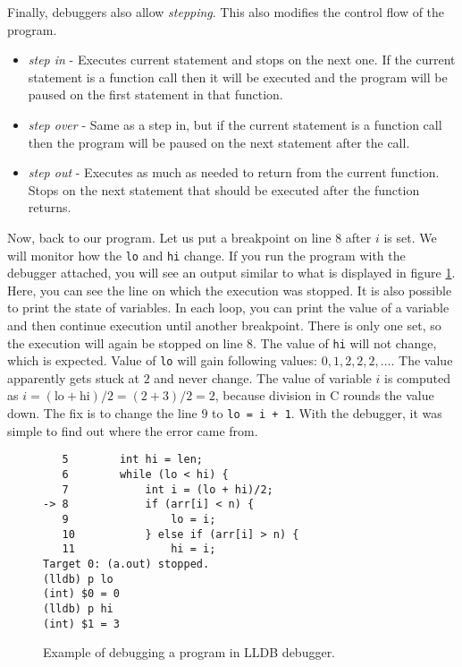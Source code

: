 Finally, debuggers also allow \textit{stepping}. This also modifies the control
flow of the program.
\begin{itemize}
    \item \textit{step in} - Executes current statement and stops on the next
        one. If the current statement is a function call then it will be
        executed and the program will be paused on the first statement in that
        function.
    \item \textit{step over} - Same as a step in, but if the current statement
        is a function call then the program will be paused on the next
        statement after the call.
    \item \textit{step out} -  Executes as much as needed to return from the
        current function. Stops on the next statement that should be executed
        after the function returns.
\end{itemize}

Now, back to our program. Let us put a breakpoint on line $8$ after $i$ is set.
We will monitor how the \texttt{lo} and \texttt{hi} change. If you run the
program with the debugger attached, you will see an output similar to what is
displayed in figure \ref{fig:lldb-debug1}. Here, you can see the line on which
the execution was stopped. It is also possible to print the state of variables.
In each loop, you can print the value of a variable and then continue execution
until another breakpoint. There is only one set, so the execution will again be
stopped on line $8$. The value of \texttt{hi} will not change, which is
expected. Value of \texttt{lo} will gain following values: $0, 1, 2, 2, 2,
\dots$. The value apparently gets stuck at $2$ and never change. The value of
variable $i$ is computed as $i = (\text{lo} + \text{hi})/2 = (2 + 3)/2 = 2$,
because division in C rounds the value down. The fix is to change the line $9$
to \texttt{lo = i + 1}. With the debugger, it was simple to find out where the
error came from.

\begin{figure}\label{fig:lldb-debug1}
\begin{verbatim}
   5   	    int hi = len;
   6   	    while (lo < hi) {
   7   	        int i = (lo + hi)/2;
-> 8   	        if (arr[i] < n) {
   9   	            lo = i;
   10  	        } else if (arr[i] > n) {
   11  	            hi = i;
Target 0: (a.out) stopped.
(lldb) p lo
(int) $0 = 0
(lldb) p hi
(int) $1 = 3
\end{verbatim}
\caption{Example of debugging a program in LLDB debugger.}
\end{figure}

